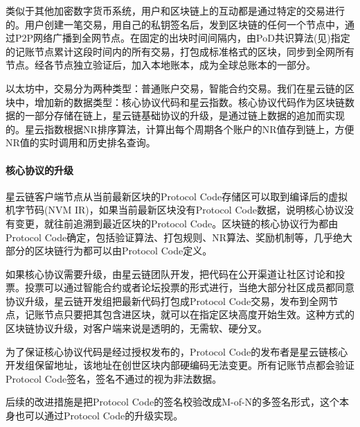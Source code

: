 类似于其他加密数字货币系统，用户和区块链上的互动都是通过特定的交易进行的。用户创建一笔交易，用自己的私钥签名后，发到区块链的任何一个节点中，通过P2P网络广播到全网节点。在固定的出块时间间隔内，由PoD共识算法(见)指定的记账节点累计这段时间内的所有交易，打包成标准格式的区块，同步到全网所有节点。经各节点独立验证后，加入本地账本，成为全球总账本的一部分。

以太坊中，交易分为两种类型：普通账户交易，智能合约交易。我们在星云链的区块中，增加新的数据类型：核心协议代码和星云指数。核心协议代码作为区块链数据的一部分存储在链上，星云链基础协议的升级，是通过链上数据的追加而实现的。星云指数根据NR排序算法，计算出每个周期各个账户的NR值存到链上，方便NR值的实时调用和历史排名查询。

\paragraph{核心协议的升级}

星云链客户端节点从当前最新区块的Protocol Code存储区可以取到编译后的虚拟机字节码(NVM IR)，如果当前最新区块没有Protocol Code数据，说明核心协议没有变更，就往前追溯到最近区块的Protocol Code。区块链的核心协议行为都由Protocol Code确定，包括验证算法、打包规则、NR算法、奖励机制等，几乎绝大部分的区块链行为都可以由Protocol Code定义。

如果核心协议需要升级，由星云链团队开发，把代码在公开渠道让社区讨论和投票。投票可以通过智能合约或者论坛投票的形式进行，当绝大部分社区成员都同意协议升级，星云链开发组把最新代码打包成Protocol Code交易，发布到全网节点，记账节点只要把其包含进区块，就可以在指定区块高度开始生效。这种方式的区块链协议升级，对客户端来说是透明的，无需软、硬分叉。

为了保证核心协议代码是经过授权发布的，Protocol Code的发布者是星云链核心开发组保留地址，该地址在创世区块内部硬编码无法变更。所有记账节点都会验证Protocol Code签名，签名不通过的视为非法数据。

后续的改进措施是把Protocol Code的签名校验改成M-of-N的多签名形式，这个本身也可以通过Protocol Code的升级实现。
